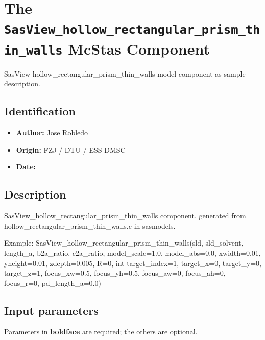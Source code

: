 \section{The \texttt{SasView\_hollow\_rectangular\_prism\_thin\_walls} McStas Component}
SasView hollow\_rectangular\_prism\_thin\_walls model component as sample description.

\subsection*{Identification}
\begin{itemize}
  \item \textbf{Author:} Jose Robledo
  \item \textbf{Origin:} FZJ / DTU / ESS DMSC
  \item \textbf{Date:} 
\end{itemize}

\subsection*{Description}
SasView\_hollow\_rectangular\_prism\_thin\_walls component, generated from hollow\_rectangular\_prism\_thin\_walls.c in sasmodels.

Example: SasView\_hollow\_rectangular\_prism\_thin\_walls(sld, sld\_solvent, length\_a, b2a\_ratio, c2a\_ratio, model\_scale=1.0, model\_abs=0.0, xwidth=0.01, yheight=0.01, zdepth=0.005, R=0, int target\_index=1, target\_x=0, target\_y=0, target\_z=1, focus\_xw=0.5, focus\_yh=0.5, focus\_aw=0, focus\_ah=0, focus\_r=0, pd\_length\_a=0.0)

\subsection*{Input parameters}
Parameters in \textbf{boldface} are required; the others are optional.


